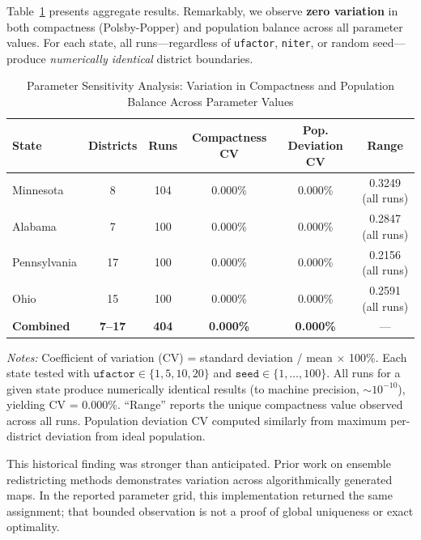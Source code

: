Table~\ref{tab:parameter-sensitivity} presents aggregate results. Remarkably, we observe \textbf{zero variation} in both compactness (Polsby-Popper) and population balance across all parameter values. For each state, all runs---regardless of \texttt{ufactor}, \texttt{niter}, or random seed---produce \textit{numerically identical} district boundaries.

\begin{table}[t]
\centering
\caption{Parameter Sensitivity Analysis: Variation in Compactness and Population Balance Across Parameter Values}
\label{tab:parameter-sensitivity}
\small
\begin{tabular}{lccccc}
\toprule
\textbf{State} & \textbf{Districts} & \textbf{Runs} & \textbf{Compactness CV} & \textbf{Pop. Deviation CV} & \textbf{Range} \\
\midrule
Minnesota & 8 & 104 & 0.000\% & 0.000\% & 0.3249 (all runs) \\
Alabama & 7 & 100 & 0.000\% & 0.000\% & 0.2847 (all runs) \\
Pennsylvania & 17 & 100 & 0.000\% & 0.000\% & 0.2156 (all runs) \\
Ohio & 15 & 100 & 0.000\% & 0.000\% & 0.2591 (all runs) \\
\midrule
\textbf{Combined} & \textbf{7--17} & \textbf{404} & \textbf{0.000\%} & \textbf{0.000\%} & --- \\
\bottomrule
\end{tabular}
\medskip
\begin{minipage}{\textwidth}
\small
\textit{Notes:} Coefficient of variation (CV) = standard deviation / mean $\times$ 100\%. Each state tested with $\texttt{ufactor} \in \{1, 5, 10, 20\}$ and $\texttt{seed} \in \{1, \ldots, 100\}$. All runs for a given state produce numerically identical results (to machine precision, $\sim 10^{-10}$), yielding CV = 0.000\%. ``Range'' reports the unique compactness value observed across all runs. Population deviation CV computed similarly from maximum per-district deviation from ideal population.
\end{minipage}
\end{table}

This historical finding was stronger than anticipated. Prior work on ensemble redistricting methods \citep{chen2013unintentional, deford2019} demonstrates variation across algorithmically generated maps. In the reported parameter grid, this implementation returned the same assignment; that bounded observation is not a proof of global uniqueness or exact optimality.

